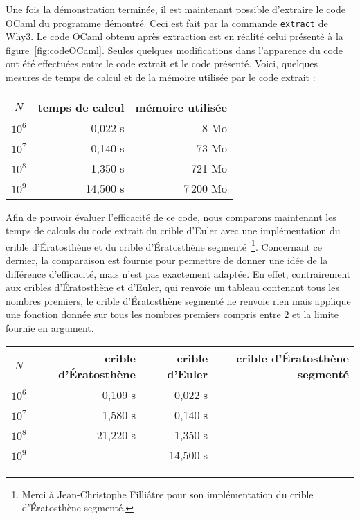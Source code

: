 \documentclass[a4paper]{easychair}
\begin{document}
Une fois la démonstration terminée, il est maintenant possible d'extraire
le code OCaml du programme démontré. Ceci est fait par la commande
\texttt{extract} de Why3.
Le code OCaml obtenu après extraction est en réalité celui présenté
à la figure~\ref{fig:codeOCaml}.
Seules quelques modifications dans l'apparence du code ont été effectuées
entre le code extrait et le code présenté.
Voici, quelques mesures de temps de calcul et de la mémoire utilisée par
le code extrait :
\begin{center}
  \begin{tabular}{|c|r|r|}
    \hline
    $N$ & temps de calcul & mémoire utilisée \\
    \hline\hline
    $10^6$ &  0,022 s &      8 Mo \\\hline
    $10^7$ &  0,140 s &     73 Mo \\\hline
    $10^8$ &  1,350 s &    721 Mo \\\hline
    $10^9$ & 14,500 s & 7\,200 Mo \\\hline
  \end{tabular}
\end{center}


Afin de pouvoir évaluer l'efficacité de ce code, nous comparons maintenant
les temps de calculs du code extrait du crible d'Euler avec une
implémentation du crible d'Ératosthène et du crible d'Ératosthène
segmenté~\footnote{Merci à
  Jean-Christophe Filliâtre pour son implémentation du crible d'Ératosthène
  segmenté.}.
Concernant ce dernier, la comparaison est fournie pour permettre de donner
une idée de la différence d'efficacité, mais n'est pas exactement adaptée.
En effet, contrairement aux cribles d'Ératosthène et d'Euler, qui renvoie
un tableau contenant tous les nombres premiers, le crible d'Ératosthène segmenté
ne renvoie rien mais applique une fonction donnée sur tous les nombres premiers
compris entre $2$ et la limite fournie en argument.
\begin{center}
  \begin{tabular}{|c|r|r|r|}
    \hline
    $N$ & crible d'Ératosthène & crible d'Euler & crible d'Ératosthène segmenté \\
    \hline\hline
    $10^6$ &  0,109 s &  0,022 s &       \\\hline
    $10^7$ &  1,580 s &  0,140 s &       \\\hline
    $10^8$ & 21,220 s &  1,350 s &       \\\hline
    $10^9$ &          & 14,500 s &       \\\hline
  \end{tabular}
\end{center}
\end{document}
